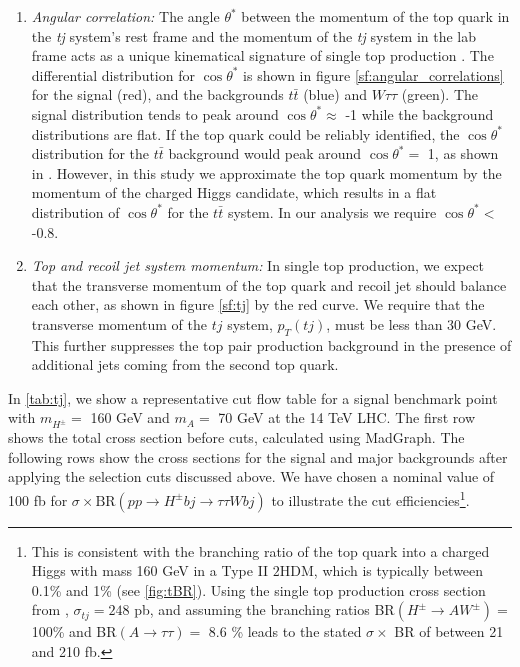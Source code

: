 \begin{enumerate}
\begin{marginfigure}
\centering
\caption{Normalized distributions of $\cos\theta^*$ (top) and the transverse momentum of the $tj$ system $p_{T}(tj)$ (bottom), for case A with $m_{H^{\pm}}=$ 160 GeV.}
\end{marginfigure}

\item \emph{Angular correlation:} The angle $\theta^{*}$ between the momentum of the top quark in the \emph{tj} system's rest frame and the momentum of the \emph{tj} system in the lab frame acts as a unique kinematical signature of single top production \cite{Kling:2012up}. The differential distribution for $\cos\theta^{*}$ is shown in figure \autoref{sf:angular_correlations} for the signal (red), and the backgrounds $t\bar{t}$ (blue) and $W\tau\tau$ (green). The signal distribution tends to peak around $\cos\theta^* \approx$ -1 while the background distributions are flat. If the top quark could be reliably identified, the $\cos\theta^{*}$ distribution for the $t\bar{t}$ background would peak around $\cos\theta^{*}=$ 1, as shown in \cite{Kling:2012up}. However, in this study we approximate the top quark momentum by the momentum of the charged Higgs candidate, which results in a flat distribution of $\cos\theta^*$ for the $t\bar{t}$ system. In our analysis we require $\cos\theta^*<$ -0.8.
 
\item\emph{Top and recoil jet system momentum:} In single top production, we expect that the transverse momentum of the top quark and recoil jet should balance each other, as shown in figure \autoref{sf:tj} by the red curve. We require that the transverse momentum of the $tj$ system, $p_{T}(tj)$, must be less than 30 GeV. This further suppresses the top pair production background in the presence of additional jets coming from the second top quark.
\end{enumerate}
In \autoref{tab:tj}, we show a representative cut flow table for a signal benchmark point with $m_{H^{\pm}} =$ 160 GeV and $m_A =$ 70 GeV at the 14 TeV LHC. The first row shows the total cross section before cuts, calculated using MadGraph. The following rows show the cross sections for the signal and major backgrounds after applying the selection cuts discussed above. We have chosen a nominal value of 100 fb for $\sigma \times \text{BR}( p p \rightarrow H^{\pm} b j \rightarrow \tau \tau W bj)$ to illustrate the cut efficiencies\footnote{This is consistent with the branching ratio of the top quark into a charged Higgs with mass 160 GeV in a Type II $2$HDM, which is typically between 0.1\% and 1\% (see \autoref{fig:tBR}). Using the single top production cross section from \cite{Kidonakis:2012db}, $\sigma_{tj}=248$ pb, and assuming the branching ratios BR$(H^{\pm} \rightarrow AW^{\pm}) =$ 100\% and BR$(A \rightarrow \tau\tau)=$ 8.6 \% leads to the stated $\sigma\times$ BR of between 21 and 210 fb.}.
